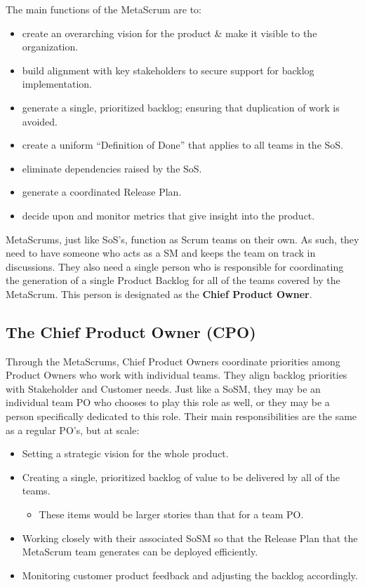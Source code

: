 \documentclass[12pt,a4paper,parskip=full]{scrartcl}
\begin{document}
The main functions of the MetaScrum are to:
\begin{itemize}
\item create an overarching vision for the product \& make it visible to
the organization.
\item build alignment with key stakeholders to secure support for backlog
implementation.
\item generate a single, prioritized backlog; ensuring that duplication of
work is avoided.
\item create a uniform ``Definition of Done'' that applies to all teams in
the SoS.
\item eliminate dependencies raised by the SoS.
\item generate a coordinated Release Plan.
\item decide upon and monitor metrics that give insight into the product.
\end{itemize}
MetaScrums, just like SoS's, function as Scrum teams on their own. As such,
they need to have someone who acts as a SM and keeps the team on track in
discussions. They also need a single person who is responsible for coordinating the
generation of a single Product Backlog for all of the teams covered by the
MetaScrum. This person is designated as the \textbf{Chief Product Owner}.

\subsection{The Chief Product Owner (CPO)}
Through the MetaScrums, Chief Product Owners coordinate priorities among
Product Owners who work with individual teams. They align backlog
priorities with Stakeholder and Customer needs. Just like a SoSM, they may
be an individual team PO who chooses to play this role as well, or they may
be a person specifically dedicated to this role. Their main
responsibilities are the same as a regular PO's, but at scale:
\begin{itemize}
\item Setting a strategic vision for the whole product.
\item Creating a single, prioritized backlog of value to be delivered by
all of the teams.
\begin{itemize}
\item These items would be larger stories than that for a team PO.
\end{itemize}
\item Working closely with their associated SoSM so that the Release Plan
that the MetaScrum team generates can be deployed efficiently.
\item Monitoring customer product feedback and adjusting the backlog
accordingly.
\end{itemize}
\end{document}
